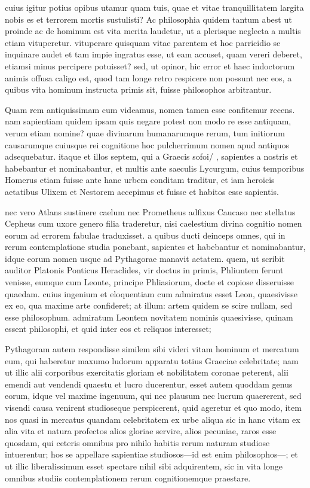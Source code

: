  cuius igitur potius opibus utamur quam tuis, quae et vitae tranquillitatem largita nobis es et terrorem mortis sustulisti? Ac philosophia quidem tantum abest ut proinde ac de hominum est vita merita laudetur, ut a plerisque neglecta a multis etiam vituperetur. vituperare quisquam vitae parentem et hoc parricidio se inquinare audet et tam impie ingratus esse, ut eam accuset, quam vereri deberet, etiamsi minus percipere potuisset? sed, ut opinor, hic error et haec indoctorum animis offusa caligo est, quod tam longe retro respicere non possunt nec eos, a quibus vita hominum instructa primis sit, fuisse philosophos arbitrantur.

 Quam rem antiquissimam cum videamus, nomen tamen esse confitemur recens. nam sapientiam quidem ipsam quis negare potest non modo re esse antiquam, verum etiam nomine? quae divinarum humanarumque rerum, tum initiorum causarumque cuiusque rei cognitione hoc pulcherrimum nomen apud antiquos adsequebatur. itaque et illos septem, qui a Graecis sofoi/ , sapientes a nostris et habebantur et nominabantur, et multis ante saeculis Lycurgum, cuius temporibus Homerus etiam fuisse ante hanc urbem conditam traditur, et iam heroicis aetatibus Ulixem et Nestorem accepimus et fuisse et habitos esse sapientis.

 nec vero Atlans sustinere caelum nec Prometheus adfixus Caucaso nec stellatus Cepheus cum uxore genero filia traderetur, nisi caelestium divina cognitio nomen eorum ad errorem fabulae traduxisset. a quibus ducti deinceps omnes, qui in rerum contemplatione studia ponebant, sapientes et habebantur et nominabantur, idque eorum nomen usque ad Pythagorae manavit aetatem. quem, ut scribit auditor Platonis Ponticus Heraclides, vir doctus in primis, Phliuntem ferunt venisse, eumque cum Leonte, principe Phliasiorum, docte et copiose disseruisse quaedam. cuius ingenium et eloquentiam cum admiratus esset Leon, quaesivisse ex eo, qua maxime arte confideret; at illum: artem quidem se scire nullam, sed esse philosophum. admiratum Leontem novitatem nominis quaesivisse, quinam essent philosophi, et quid inter eos et reliquos interesset;

 Pythagoram autem respondisse similem sibi videri vitam hominum et mercatum eum, qui haberetur maxumo ludorum apparatu totius Graeciae celebritate; nam ut illic alii corporibus exercitatis gloriam et nobilitatem coronae peterent, alii emendi aut vendendi quaestu et lucro ducerentur, esset autem quoddam genus eorum, idque vel maxime ingenuum, qui nec plausum nec lucrum quaererent, sed visendi causa venirent studioseque perspicerent, quid ageretur et quo modo, item nos quasi in mercatus quandam celebritatem ex urbe aliqua sic in hanc vitam ex alia vita et natura profectos alios gloriae servire, alios pecuniae, raros esse quosdam, qui ceteris omnibus pro nihilo habitis rerum naturam studiose intuerentur; hos se appellare sapientiae studiosos—id est enim philosophos—; et ut illic liberalissimum esset spectare nihil sibi adquirentem, sic in vita longe omnibus studiis contemplationem rerum cognitionemque praestare.

